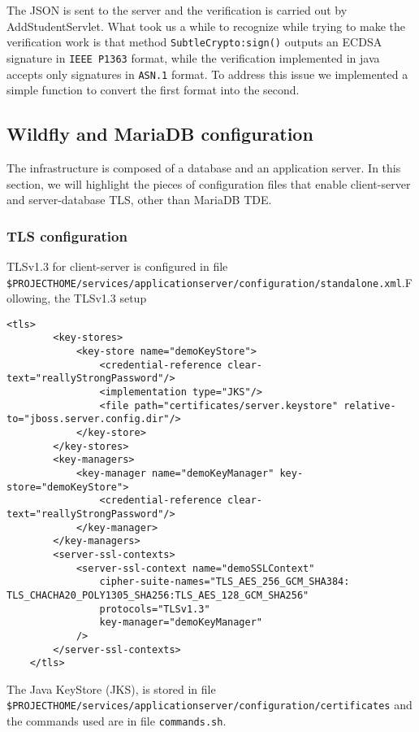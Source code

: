 The JSON is sent to the server and the verification is carried out by AddStudentServlet. What took us a while to recognize while trying to make the verification work is that method \texttt{SubtleCrypto:sign()} outputs an ECDSA signature in  \texttt{IEEE P1363} format, while the verification implemented in java accepts only signatures in \texttt{ASN.1} format. To address this issue we implemented a simple function to convert the first format into the second.

\subsection*{Wildfly and MariaDB configuration}

The infrastructure is composed of a database and an application server. In this section, we will highlight the pieces of configuration files that enable client-server and server-database TLS, other than MariaDB TDE. 

\subsubsection{TLS configuration}
TLSv1.3 for client-server is configured in file \\\texttt{\$PROJECT\textunderscore HOME/services/application\textunderscore server/configuration/standalone.xml}.Following, the TLSv1.3 setup 

\begin{lstlisting}[style=XMLStyle, label=lst:xml-tls-client-server]
    <tls>
        <key-stores>
            <key-store name="demoKeyStore">
                <credential-reference clear-text="reallyStrongPassword"/>
                <implementation type="JKS"/>
                <file path="certificates/server.keystore" relative-to="jboss.server.config.dir"/>
            </key-store>
        </key-stores>
        <key-managers>
            <key-manager name="demoKeyManager" key-store="demoKeyStore">
                <credential-reference clear-text="reallyStrongPassword"/>
            </key-manager>
        </key-managers>
        <server-ssl-contexts>
            <server-ssl-context name="demoSSLContext" 
                cipher-suite-names="TLS_AES_256_GCM_SHA384:
TLS_CHACHA20_POLY1305_SHA256:TLS_AES_128_GCM_SHA256"
                protocols="TLSv1.3" 
                key-manager="demoKeyManager"
            />
        </server-ssl-contexts>
    </tls>
\end{lstlisting}

The Java KeyStore (JKS), is stored in file \\\texttt{\$PROJECT\textunderscore HOME/services/application\textunderscore server/configuration/certificates} and the commands used are in file \texttt{commands.sh}.


